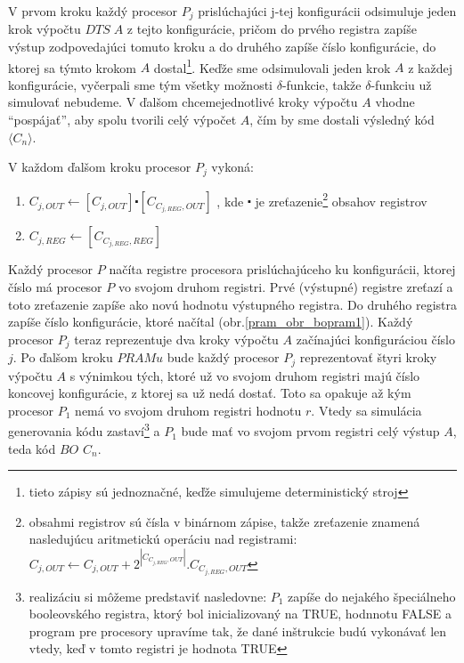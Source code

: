 \begin{dokaz}
\begin{itemize}
  V prvom kroku každý procesor $P_j$ prislúchajúci j-tej
  konfigurácii odsimuluje jeden krok výpočtu $DTS\; A$ z tejto
  konfigurácie, pričom do prvého registra zapíše výstup
  zodpovedajúci tomuto kroku a do druhého zapíše číslo
  konfigurácie, do ktorej sa týmto krokom $A$
  dostal\footnote{tieto zápisy sú jednoznačné, keďže simulujeme
  deterministický stroj}. Keďže sme odsimulovali jeden krok $A$
  z každej konfigurácie, vyčerpali sme tým všetky možnosti
  $\delta$-funkcie, takže $\delta$-funkciu už simulovať
  nebudeme. V ďalšom chceme\linebreak jednotlivé kroky výpočtu $A$ vhodne
  ``pospájať'', aby spolu tvorili celý výpočet $A$, čím by sme
  dostali výsledný kód $\langle C_n\rangle$.

  V každom ďalšom kroku procesor $P_j$ vykoná:
  \begin{enumerate}
    \item  $C_{j,OUT}\leftarrow [C_{j,OUT}]\centerdot
    [C_{C_{j,REG},OUT}]$       , kde $\centerdot$ je
    zreťazenie\footnote{obsahmi registrov sú čísla v binárnom
    zápise, takže zreťazenie znamená nasledujúcu aritmetickú
    operáciu nad registrami: $C_{j,OUT}\leftarrow C_{j,OUT} +
    2^{|C_{C_{j,REG},OUT}|}.C_{C_{j,REG},OUT}$} obsahov registrov
    \item $C_{j,REG}\leftarrow [C_{C_{j,REG},REG}]$
  \end{enumerate}
  Každý procesor $P$ načíta registre procesora
  prislúchajúceho ku konfigurácii, ktorej číslo má procesor $P$ vo
  svojom druhom registri. Prvé (výstupné) registre zreťazí a toto
  zreťazenie zapíše ako novú hodnotu výstupného registra. Do
  druhého registra zapíše číslo konfi\-gurácie, ktoré načítal
  (obr.\ref{pram_obr_bopram1}). Každý procesor $P_j$ teraz reprezentuje dva
  kroky výpočtu $A$ začínajúci konfiguráciou číslo $j$. Po ďalšom
  kroku $PRAMu$ bude každý procesor $P_j$ reprezentovať štyri kroky
  výpočtu $A$ s výnimkou tých, ktoré už vo svojom druhom registri
  majú číslo koncovej konfigurácie, z ktorej sa už nedá dostať.
  Toto sa opakuje až kým procesor $P_1$ nemá vo svojom druhom
  registri hodnotu $r$. Vtedy sa simulácia generovania
  kódu\linebreak
  zastaví\footnote{realizáciu si môžeme predstaviť nasledovne:
  $P_1$ zapíše do nejakého špeciálneho booleovského registra, ktorý
  bol inicializovaný na TRUE, hodnnotu FALSE a program pre procesory
  upravíme tak, že dané inštrukcie budú vykonávať len vtedy, keď v
  tomto registri je hodnota TRUE} a $P_1$ bude mať vo svojom prvom
  registri celý výstup $A$, teda kód $BO$ $C_n$.

\end{itemize}
\end{dokaz}
